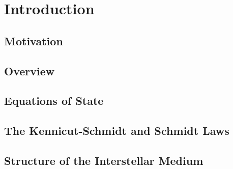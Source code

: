 \chapter{Introduction}

\section{Motivation}


\section{Overview}


\section{Equations of State}


\section{The Kennicut-Schmidt and Schmidt Laws}


\section{Structure of the Interstellar Medium}

